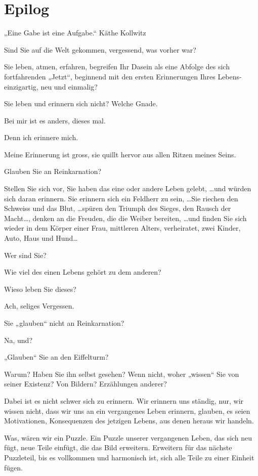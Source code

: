 \section*{Epilog}



„Eine Gabe ist eine Aufgabe.“ Käthe Kollwitz

Sind Sie auf die Welt gekommen, vergessend, was vorher war?

Sie leben,  atmen, erfahren, begreifen Ihr Dasein als eine Abfolge des sich fortfahrenden „Jetzt“, beginnend mit den ersten Erinnerungen Ihres Lebens- einzigartig, neu und einmalig?

Sie leben und erinnern sich nicht? Welche Gnade.

Bei mir ist es anders, dieses  mal.

Denn ich erinnere mich.

Meine Erinnerung ist gross, sie quillt hervor aus allen Ritzen meines Seins.

Glauben Sie an Reinkarnation?

Stellen Sie sich vor, Sie haben das eine oder andere Leben gelebt, \dots und würden sich daran erinnern. Sie erinnern sich ein Feldherr zu sein, \dots Sie riechen den Schweiss und das Blut, \dots spüren den Triumph des Sieges, den Rausch der Macht\dots, denken an die Freuden, die die Weiber bereiten, \dots und finden Sie sich wieder in dem Körper einer Frau, mittleren Alters, verheiratet, zwei Kinder, Auto, Haus und Hund\dots

Wer sind Sie?

Wie viel des einen Lebens gehört zu dem anderen?

Wieso leben Sie dieses?

Ach, seliges Vergessen.

Sie „glauben“ nicht an Reinkarnation?
 
Na, und?

„Glauben“ Sie an den Eiffelturm?

Warum? Haben Sie ihn selbst gesehen? Wenn nicht, woher „wissen“ Sie von seiner Existenz? Von Bildern? Erzählungen anderer?

Dabei ist es nicht schwer sich zu erinnern. Wir erinnern uns ständig, nur, wir wissen nicht, dass wir uns an ein vergangenes Leben erinnern, glauben, es seien Motivationen, Konsequenzen des jetzigen Lebens, aus denen heraus wir handeln.

Was, wären wir ein Puzzle. Ein Puzzle unserer vergangenen Leben, das sich neu fügt, neue Teile einfügt, die das Bild erweitern. Erweitern für das nächste Puzzleteil, bis es vollkommen und harmonisch ist, sich alle Teile zu einer Einheit fügen.

